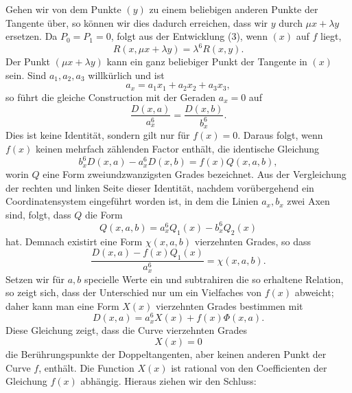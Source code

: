 \documentclass[11pt]{article}
\begin{document}
Gehen wir von dem Punkte \((y)\) zu einem beliebigen anderen Punkte der Tangente über, so können wir dies dadurch erreichen, dass wir \(y\) durch \(\mu x+\lambda y\) ersetzen. Da \(P_0=P_1=0\), folgt aus der Entwicklung (3), wenn \((x)\) auf \(f\) liegt,
\begin{equation}
 R(x,\mu x+\lambda y)=\lambda^6 R(x,y).
 \tag{11}
\end{equation}
Der Punkt \((\mu x+\lambda y)\) kann ein ganz beliebiger Punkt der Tangente in \((x)\) sein. Sind \(a_1,a_2,a_3\) willkürlich und ist
\begin{equation}
 a_x=a_1x_1+a_2x_2+a_3x_3,
 \tag{13}
\end{equation}
so führt die gleiche Construction mit der Geraden \(a_x=0\) auf
\begin{equation}
 \frac{D(x,a)}{a_x^6}=\frac{D(x,b)}{b_x^6}.
 \tag{14}
\end{equation}
Dies ist keine Identität, sondern gilt nur für \(f(x)=0\). Daraus folgt, wenn \(f(x)\) keinen mehrfach zählenden Factor enthält, die identische Gleichung
\begin{equation}
 b_x^6D(x,a)-a_x^6D(x,b)=f(x)Q(x,a,b),
 \tag{15}
\end{equation}
worin \(Q\) eine Form zweiundzwanzigsten Grades bezeichnet. Aus der Vergleichung der rechten und linken Seite dieser Identität, nachdem vorübergehend ein Coordinatensystem eingeführt worden ist, in dem die Linien \(a_x,b_x\) zwei Axen sind, folgt, dass \(Q\) die Form
\[
 Q(x,a,b)=a_x^6Q_1(x)-b_x^6Q_2(x)
\]
hat. Demnach existirt eine Form \(\chi(x,a,b)\) vierzehnten Grades, so dass
\begin{equation}
 \frac{D(x,a)-f(x)Q_1(x)}{a_x^6}=\chi(x,a,b).
 \tag{16}
\end{equation}
Setzen wir für \(a,b\) specielle Werte ein und subtrahiren die so erhaltene Relation, so zeigt sich, dass der Unterschied nur um ein Vielfaches von \(f(x)\) abweicht; daher kann man eine Form \(X(x)\) vierzehnten Grades bestimmen mit
\begin{equation}
 D(x,a)=a_x^6X(x)+f(x)\Phi(x,a).
 \tag{18}
\end{equation}
Diese Gleichung zeigt, dass die Curve vierzehnten Grades
\begin{equation}
 X(x)=0
 \tag{19}
\end{equation}
die Berührungspunkte der Doppeltangenten, aber keinen anderen Punkt der Curve \(f\), enthält. Die Function \(X(x)\) ist rational von den Coefficienten der Gleichung \(f(x)\) abhängig. Hieraus ziehen wir den Schluss:
\end{document}
